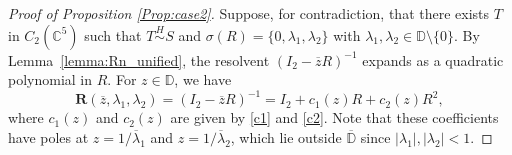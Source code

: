 \documentclass[10pt,a4paper]{amsart}
\begin{document}
\begin{proof}[Proof of Proposition \ref{Prop:case2}]
	Suppose, for contradiction, that there exists $T$ in $C_2(\mathbb{C}^{5})$ such that $T \stackrel{H}{\sim} S$ and $\sigma(R)=\{0, \lambda_1, \lambda_2\}$ with $\lambda_1, \lambda_2 \in \mathbb{D} \setminus \{0\}$. By Lemma~\ref{lemma:Rn_unified}, the resolvent $(I_2 - \overline{z}R)^{-1}$ expands as a quadratic polynomial in $R$. For $z \in \mathbb{D}$, we have
	\begin{equation}\label{resolvent_expansion}
		\mathbf{R}(\overline{z}, \lambda_1, \lambda_2) = (I_2 - \overline{z}R)^{-1} =  I_2 + c_1(z) R + c_2(z) R^2,
	\end{equation}
	where $c_1(z)$ and $c_2(z)$ are given by \eqref{c1} and \eqref{c2}. Note that these coefficients have poles at $z = 1/\overline{\lambda}_1$ and $z = 1/\overline{\lambda}_2$, which lie outside $\overline{\mathbb{D}}$ since $|\lambda_1|, |\lambda_2| < 1$.
	

\end{proof}
\end{document}
